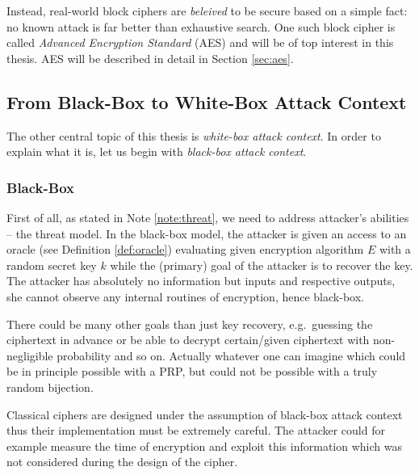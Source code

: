 Instead, real-world block ciphers are {\em beleived} to be secure based on a simple fact: no known attack is far better than exhaustive search. One such block cipher is called {\em Advanced Encryption Standard} (AES) and will be of top interest in this thesis. AES will be described in detail in Section \ref{sec:aes}.



\subsection{From Black-Box to White-Box Attack Context}
\label{sec:bbtowb}

The other central topic of this thesis is {\em white-box attack context}. In order to explain what it is, let us begin with {\em black-box attack context}.

\subsubsection{Black-Box}

First of all, as stated in Note \ref{note:threat}, we need to address attacker's abilities -- the threat model. In the black-box model, the attacker is given an access to an oracle (see Definition \ref{def:oracle}) evaluating given encryption algorithm $E$ with a random secret key $k$ while the (primary) goal of the attacker is to recover the key. The attacker has absolutely no information but inputs and respective outputs, she cannot observe any internal routines of encryption, hence black-box.

\begin{note}
	There could be many other goals than just key recovery, e.g.\ guessing the ciphertext in advance or be able to decrypt certain/given ciphertext with non-negligible probability and so on. Actually whatever one can imagine which could be in principle possible with a PRP, but could not be possible with a truly random bijection.
\end{note}

Classical ciphers are designed under the assumption of black-box attack context thus their implementation must be extremely careful. The attacker could for example measure the time of encryption and exploit this information which was not considered during the design of the cipher.

